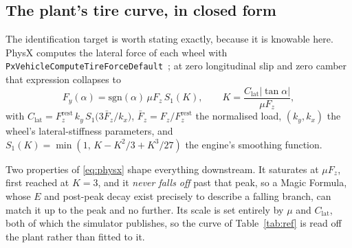 \subsection{The plant's tire curve, in closed form}
\label{subsec:planttire}

The identification target is worth stating exactly, because it is knowable
here. PhysX computes the lateral force of each wheel with
\texttt{PxVehicle\-Compute\-Tire\-Force\-Default}~\cite{physxvehicle}; at zero
longitudinal slip and zero camber that expression collapses to
\begin{equation}
F_{y}(\alpha)=\mathrm{sgn}(\alpha)\,\mu F_{z}\,S_{1}(K),\qquad
K=\frac{C_{\mathrm{lat}}|\tan\alpha|}{\mu F_{z}},
\label{eq:physx}
\end{equation}
with $C_{\mathrm{lat}}=F_{z}^{\mathrm{rest}}\,k_{y}\,
S_{1}\!\big(3\bar F_{z}/k_{x}\big)$, $\bar F_{z}=F_{z}/F_{z}^{\mathrm{rest}}$
the normalised load, $(k_{y},k_{x})$ the wheel's lateral-stiffness parameters,
and $S_{1}(K)=\min(1,\,K-K^{2}/3+K^{3}/27)$ the engine's smoothing function.

Two properties of \eqref{eq:physx} shape everything downstream. It saturates
at $\mu F_{z}$, first reached at $K=3$, and it \emph{never falls off} past
that peak, so a Magic Formula, whose $E$ and post-peak decay exist precisely
to describe a falling branch, can match it up to the peak and no further. Its
scale is set entirely by $\mu$ and $C_{\mathrm{lat}}$, both of which the
simulator publishes, so the curve of Table~\ref{tab:ref} is read off the plant
rather than fitted to it.

